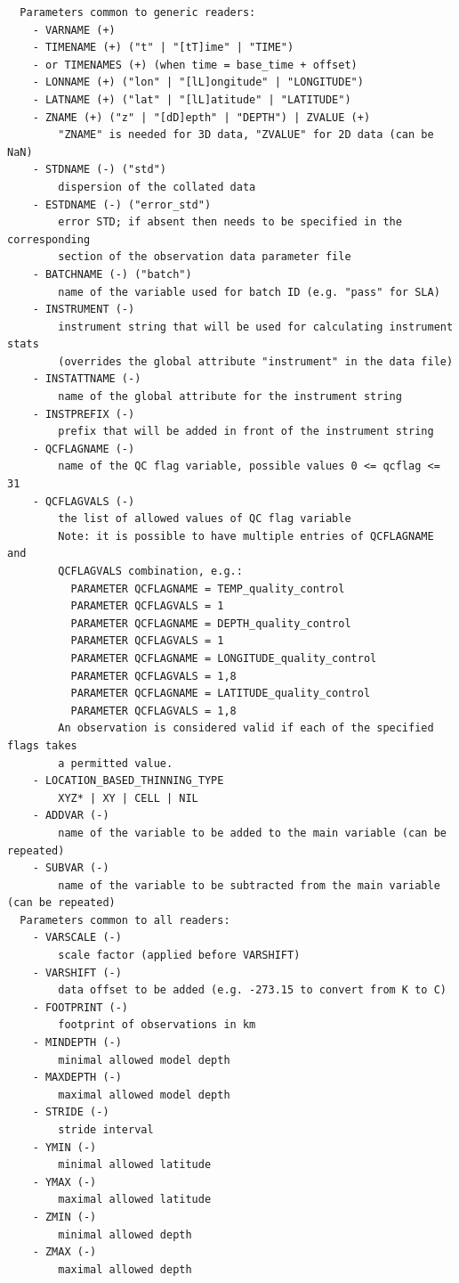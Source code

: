 \documentclass[11pt]{report}
\begin{document}
\begin{Verbatim}
  Parameters common to generic readers:
    - VARNAME (+)
    - TIMENAME (+) ("t" | "[tT]ime" | "TIME")
    - or TIMENAMES (+) (when time = base_time + offset)
    - LONNAME (+) ("lon" | "[lL]ongitude" | "LONGITUDE")
    - LATNAME (+) ("lat" | "[lL]atitude" | "LATITUDE")
    - ZNAME (+) ("z" | "[dD]epth" | "DEPTH") | ZVALUE (+)
        "ZNAME" is needed for 3D data, "ZVALUE" for 2D data (can be NaN)
    - STDNAME (-) ("std")
        dispersion of the collated data
    - ESTDNAME (-) ("error_std")
        error STD; if absent then needs to be specified in the corresponding
        section of the observation data parameter file
    - BATCHNAME (-) ("batch")
        name of the variable used for batch ID (e.g. "pass" for SLA)
    - INSTRUMENT (-)
        instrument string that will be used for calculating instrument stats
        (overrides the global attribute "instrument" in the data file)
    - INSTATTNAME (-)
        name of the global attribute for the instrument string
    - INSTPREFIX (-)
        prefix that will be added in front of the instrument string
    - QCFLAGNAME (-)
        name of the QC flag variable, possible values 0 <= qcflag <= 31
    - QCFLAGVALS (-)
        the list of allowed values of QC flag variable
        Note: it is possible to have multiple entries of QCFLAGNAME and
        QCFLAGVALS combination, e.g.:
          PARAMETER QCFLAGNAME = TEMP_quality_control
          PARAMETER QCFLAGVALS = 1
          PARAMETER QCFLAGNAME = DEPTH_quality_control
          PARAMETER QCFLAGVALS = 1
          PARAMETER QCFLAGNAME = LONGITUDE_quality_control
          PARAMETER QCFLAGVALS = 1,8
          PARAMETER QCFLAGNAME = LATITUDE_quality_control
          PARAMETER QCFLAGVALS = 1,8
        An observation is considered valid if each of the specified flags takes
        a permitted value.
    - LOCATION_BASED_THINNING_TYPE
        XYZ* | XY | CELL | NIL
    - ADDVAR (-)
        name of the variable to be added to the main variable (can be repeated)
    - SUBVAR (-)
        name of the variable to be subtracted from the main variable (can be repeated)
  Parameters common to all readers:
    - VARSCALE (-)
        scale factor (applied before VARSHIFT)
    - VARSHIFT (-)
        data offset to be added (e.g. -273.15 to convert from K to C)
    - FOOTPRINT (-)
        footprint of observations in km
    - MINDEPTH (-)
        minimal allowed model depth
    - MAXDEPTH (-)
        maximal allowed model depth
    - STRIDE (-)
        stride interval
    - YMIN (-)
        minimal allowed latitude
    - YMAX (-)
        maximal allowed latitude
    - ZMIN (-)
        minimal allowed depth
    - ZMAX (-)
        maximal allowed depth
\end{Verbatim}
\end{document}
